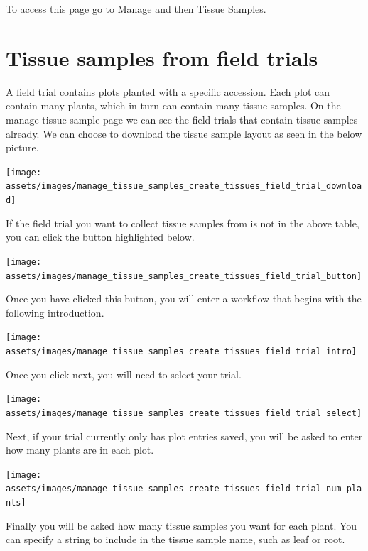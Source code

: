 \documentclass[
  12pt,
]{book}
\begin{document}
To access this page go to Manage and then Tissue Samples.

\hypertarget{tissue-samples-from-field-trials}{%
\section{Tissue samples from field trials}\label{tissue-samples-from-field-trials}}

A field trial contains plots planted with a specific accession. Each plot can contain many plants, which in turn can contain many tissue samples. On the manage tissue sample page we can see the field trials that contain tissue samples already. We can choose to download the tissue sample layout as seen in the below picture.

\begin{center}\texttt{[image: assets/images/manage\_tissue\_samples\_create\_tissues\_field\_trial\_download]} \end{center}

If the field trial you want to collect tissue samples from is not in the above table, you can click the button highlighted below.

\begin{center}\texttt{[image: assets/images/manage\_tissue\_samples\_create\_tissues\_field\_trial\_button]} \end{center}

Once you have clicked this button, you will enter a workflow that begins with the following introduction.

\begin{center}\texttt{[image: assets/images/manage\_tissue\_samples\_create\_tissues\_field\_trial\_intro]} \end{center}

Once you click next, you will need to select your trial.

\begin{center}\texttt{[image: assets/images/manage\_tissue\_samples\_create\_tissues\_field\_trial\_select]} \end{center}

Next, if your trial currently only has plot entries saved, you will be asked to enter how many plants are in each plot.

\begin{center}\texttt{[image: assets/images/manage\_tissue\_samples\_create\_tissues\_field\_trial\_num\_plants]} \end{center}

Finally you will be asked how many tissue samples you want for each plant. You can specify a string to include in the tissue sample name, such as leaf or root.
\end{document}

